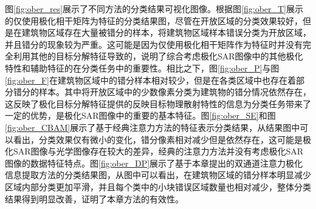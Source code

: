 图\ref{fig:ober_res}展示了不同方法的分类结果可视化图像。根据图\ref{fig:ober_T}展示的仅使用极化相干矩阵为特征的分类结果图，尽管在开放区域的分类效果较好，但是在建筑物区域存在大量被错分的样本，将建筑物区域样本错误分类为开放区域，并且错分的现象较为严重。这可能是因为仅使用极化相干矩阵作为特征时并没有完全利用其他的目标分解特征导致的，说明了综合考虑极化SAR图像中的其他极化特性和辅助特征的在分类任务中的重要性。相比之下，图\ref{fig:ober_P}与图\ref{fig:ober_F}在建筑物区域中的错分样本相对较少，但是在各类区域中也存在着部分错分的样本。其中将开放区域中的少数像素分类为建筑物的错分情况依然存在，这反映了极化目标分解特征提供的反映目标物理散射特性的信息为分类任务带来了一定的优势，是极化SAR图像中的重要的基本特征。图\ref{fig:ober_SE}和图\ref{fig:ober_CBAM}展示了基于经典注意力方法的特征表示分类结果，从结果图中可以看出，分类效果仅有微小的变化，错分像素相对减少但是依然存在，这可能是极化SAR图像与光学图像存在较大的差异，经典的注意力方法并没有考虑极化SAR图像的数据特征特点。图\ref{fig:ober_DP}展示了基于本章提出的双通道注意力极化信息提取方法的分类结果图，从图中可以看出，在建筑物区域的错分样本明显减少区域内部分类更加平滑，并且每个类中的小块错误区域数量也相对减少，整体分类结果得到明显改善，证明了本章方法的有效性。

